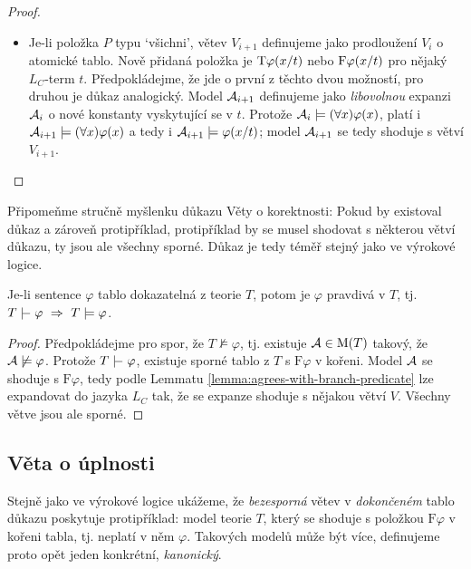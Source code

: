 \begin{proof}
\begin{itemize}
\begin{itemize}
            \item Je-li položka $P$ typu `všichni', větev $V_{i+1}$ definujeme jako prodloužení $V_i$ o atomické tablo. Nově přidaná položka je $\mathrm{T}\varphi(x/t)$ nebo $\mathrm{F}\varphi(x/t)$ pro nějaký $L_C$-term $t$. Předpokládejme, že jde o první z těchto dvou možností, pro druhou je důkaz analogický. 
            Model $\mathcal{A}_{i+1}$ definujeme jako \emph{libovolnou} expanzi $\mathcal{A}_i$ o nové konstanty vyskytující se v $t$.    
            Protože $\mathcal{A}_i\models(\forall x)\varphi(x)$, platí i $\mathcal{A}_{i+1}\models(\forall x)\varphi(x)$ a tedy i $\mathcal{A}_{i+1}\models\varphi(x/t)$; model $\mathcal{A}_{i+1}$ se tedy shoduje s větví $V_{i+1}$.
        \end{itemize}       
    \end{itemize}
\end{proof}

Připomeňme stručně myšlenku důkazu Věty o korektnosti: Pokud by existoval důkaz a zároveň protipříklad, protipříklad by se musel shodovat s některou větví důkazu, ty jsou ale všechny sporné. Důkaz je tedy téměř stejný jako ve výrokové logice.

\begin{theorem}[O korektnosti]
Je-li sentence $\varphi$ tablo dokazatelná z teorie $T$, potom je $\varphi$ pravdivá v $T$, tj. $T\proves\varphi\ \Rightarrow\ T\models\varphi$.    
\end{theorem}

\begin{proof}
Předpokládejme pro spor, že $T\not\models\varphi$, tj. existuje $\mathcal{A}\in\operatorname{M}(T)$ takový, že $\mathcal{A}\not\models\varphi$. Protože $T\proves\varphi$,  existuje sporné tablo z $T$ s $\mathrm{F}\varphi$ v kořeni. Model $\mathcal{A}$ se shoduje s $\mathrm{F}\varphi$, tedy podle Lemmatu \ref{lemma:agrees-with-branch-predicate} lze expandovat do jazyka $L_C$ tak, že se expanze shoduje s nějakou větví $V$. Všechny větve jsou ale sporné.
\end{proof}

\subsection{Věta o úplnosti}

Stejně jako ve výrokové logice ukážeme, že \emph{bezesporná} větev v \emph{dokončeném} tablo důkazu poskytuje protipříklad: model teorie $T$, který se shoduje s položkou $\mathrm{F}\varphi$ v kořeni tabla, tj. neplatí v něm $\varphi$. Takových modelů může být více, definujeme proto opět jeden konkrétní, \emph{kanonický}.


